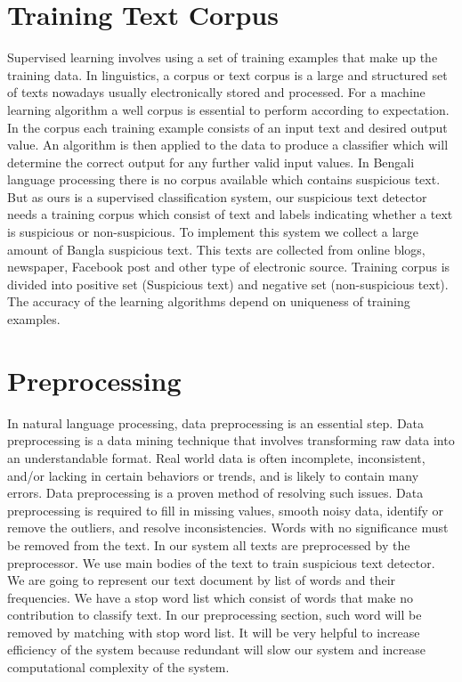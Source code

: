  \section{Training Text Corpus}
 Supervised learning involves using a set of training examples that make up the training data. In linguistics, a corpus or text corpus is a large and structured set of texts nowadays usually electronically stored and processed. For a machine learning algorithm a well corpus is essential to perform according to expectation. In the corpus each training example consists of an input text and desired output value. An algorithm is then applied to the data to produce a classifier which will determine the correct output for any further valid input values. In Bengali language processing there is no corpus available which contains suspicious text. But as ours is a supervised classification system, our suspicious text detector needs a training corpus which consist of text and labels indicating whether a text is suspicious or non-suspicious. To implement this system we collect a large amount of Bangla  suspicious text. This texts are collected from online blogs, newspaper, Facebook post and other type of electronic source. Training corpus is divided into positive set (Suspicious text) and negative set (non-suspicious text). The accuracy of the learning algorithms depend on uniqueness of training examples.
 
 \section{Preprocessing}
 In natural language processing, data preprocessing is an essential step. Data preprocessing is a data mining technique that involves transforming raw data into an understandable format. Real world data is often incomplete, inconsistent, and/or lacking in certain behaviors or trends, and is likely to contain many errors. Data preprocessing is a proven method of resolving such issues. Data preprocessing is required to fill in missing values, smooth noisy data, identify or remove the outliers, and resolve inconsistencies.
 Words with no significance must be removed from the text. In our system all texts are preprocessed by the preprocessor. We use main bodies of the text to train suspicious text detector. We are going to represent our text document by list of words and their frequencies. We have a stop word list which consist of words that make no contribution to classify text. In our preprocessing section, such word will be removed by matching with stop word list. It will be very helpful to increase efficiency of the system because redundant will slow our system and increase computational complexity of the system.
 
